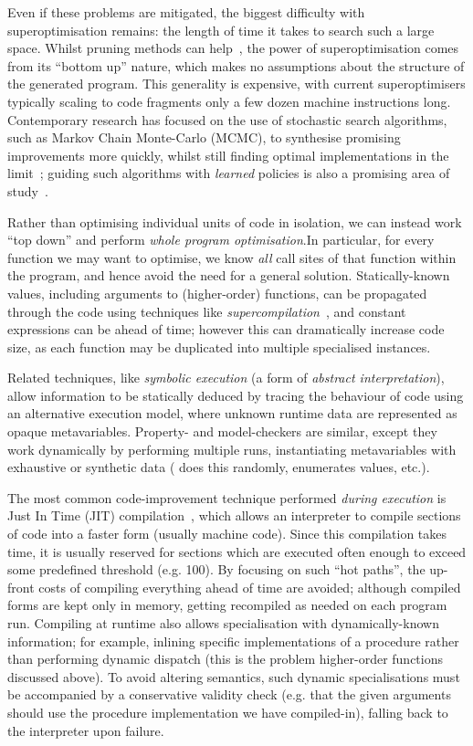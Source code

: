 Even if these problems are mitigated, the biggest difficulty with
superoptimisation remains: the length of time it takes to search such a
large space. Whilst pruning methods can help~\cite{phothilimthana2016scaling},
the power of superoptimisation comes from its ``bottom up'' nature, which makes
no assumptions about the structure of the generated program. This generality is
expensive, with current superoptimisers typically scaling to code fragments only
a few dozen machine instructions long. Contemporary research has focused on the
use of stochastic search algorithms, such as Markov Chain Monte-Carlo (MCMC), to
synthesise promising improvements more quickly, whilst still finding optimal
implementations in the limit~\cite{schkufza2013stochastic}; guiding such
algorithms with \emph{learned} policies is also a promising area of
study~\cite{mudigonda2017learning}.

Rather than optimising individual units of code in isolation, we can instead
work ``top down'' and perform \emph{whole program optimisation}.\iffalse TODO: Cite MLTon, Stalin,
maybe others \fi In particular, for every function we may want to optimise, we
know \emph{all} call sites of that function within the program, and hence avoid
the need for a general solution. Statically-known values, including arguments to
(higher-order) functions, can be propagated through the code using techniques
like \emph{supercompilation}~\cite{Turchin:1986:CS:5956.5957}, and constant
expressions can be ahead of time; however this can dramatically increase code
size, as each function may be duplicated into multiple specialised instances.

Related techniques, like \emph{symbolic execution} (a form of \emph{abstract
  interpretation}), allow information to be statically deduced by tracing the
behaviour of code using an alternative execution model, where unknown runtime
data are represented as opaque metavariables. Property- and model-checkers are
similar, except they work dynamically by performing multiple runs, instantiating
metavariables with exhaustive or synthetic data (\quickcheck{} does this
randomly, \smallcheck{} enumerates values, etc.).

The most common code-improvement technique performed \emph{during execution} is
Just In Time (JIT) compilation~\iffalse TODO: Cite \fi, which allows an
interpreter to compile sections of code into a faster form (usually machine
code). Since this compilation takes time, it is usually reserved for sections
which are executed often enough to exceed some predefined threshold (e.g. 100).
By focusing on such ``hot paths'', the up-front costs of compiling everything
ahead of time are avoided; although compiled forms are kept only in memory,
getting recompiled as needed on each program run. Compiling at runtime also
allows specialisation with dynamically-known information; for example, inlining
specific implementations of a procedure rather than performing dynamic dispatch
(this is the problem higher-order functions discussed above). To avoid altering
semantics, such dynamic specialisations must be accompanied by a conservative
validity check (e.g. that the given arguments should use the procedure
implementation we have compiled-in), falling back to the interpreter upon
failure.


